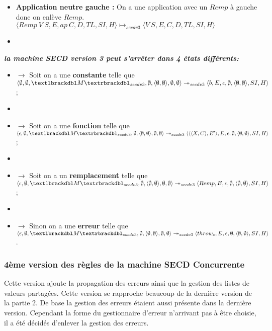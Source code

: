 \documentclass[10pt,a4paper]{report}
\begin{document}
\begin{itemize}
\begin{itemize}
			\item[] \textbf{Application neutre gauche :} On a une application avec un $Remp$ à gauche donc on enlève $Remp$.
			\smallbreak
			$\langle Remp~V~S,E,ap~C,D,TL,SI,H\rangle \longmapsto_{secdv3} \langle V~S,E,C,D,TL,SI,H\rangle$
			\item[]
		\end{itemize}
	\end{itemize}
	\bigbreak
	\bigbreak
	
	\textbf{\textit{la machine SECD version 3 peut s'arrêter dans 4 états différents:}}
	\smallbreak
	\begin{itemize}
		\item[]$\longrightarrow$ Soit on a une \textbf{constante} telle que $\langle \emptyset,\emptyset,\textlbrackdbl M\textrbrackdbl_{secdv3},\emptyset,\langle\emptyset,\emptyset\rangle,\emptyset,\emptyset\rangle \twoheadrightarrow_{secdv3} \langle b,E,\epsilon,\emptyset,\langle\emptyset,\emptyset\rangle,SI,H\rangle$;
		\item[]
		\item[]$\longrightarrow$ Soit on a une \textbf{fonction} telle que $\langle \epsilon,\emptyset,\textlbrackdbl M\textrbrackdbl_{secdv3},\emptyset,\langle\emptyset,\emptyset\rangle,\emptyset,\emptyset\rangle \twoheadrightarrow_{secdv3} \langle\langle\langle X,C\rangle,E'\rangle,E,\epsilon,\emptyset,\langle\emptyset,\emptyset\rangle,SI,H\rangle$;
		\item[]
		\item[]$\longrightarrow$ Soit on a un \textbf{remplacement} telle que $\langle \epsilon,\emptyset,\textlbrackdbl M\textrbrackdbl_{secdv3},\emptyset,\langle\emptyset,\emptyset\rangle,\emptyset,\emptyset\rangle \twoheadrightarrow_{secdv3} \langle Remp,E,\epsilon,\emptyset,\langle\emptyset,\emptyset\rangle,SI,H\rangle$;
		\item[]
		\item[]$\longrightarrow$ Sinon on a une \textbf{erreur} telle que $\langle \epsilon,\emptyset,\textlbrackdbl M\textrbrackdbl_{secdv3},\emptyset,\langle\emptyset,\emptyset\rangle,\emptyset,\emptyset\rangle \twoheadrightarrow_{secdv3} \langle throw_{e},E,\epsilon,\emptyset,\langle\emptyset,\emptyset\rangle,SI,H\rangle$.
	\end{itemize}
	\newpage
	
	
	
	\subsubsection{4ème version des règles de la machine SECD Concurrente}
	Cette version ajoute la propagation des erreurs ainsi que la gestion des listes de valeurs partagées. Cette version se rapproche beaucoup de la dernière version de la partie 2. De base la gestion des erreurs étaient aussi présente dans la dernière version. Cependant la forme du gestionnaire d'erreur n'arrivant pas à être choisie, il a été décidés d'enlever la gestion des erreurs.
	\bigbreak
	
\end{document}
